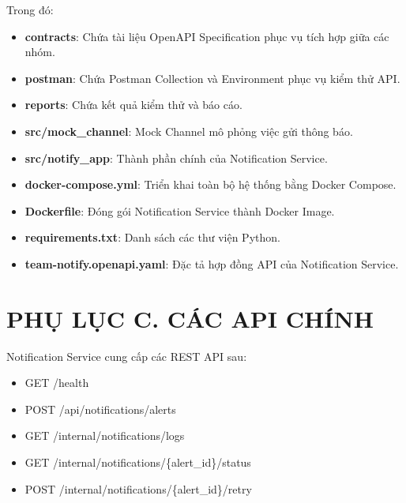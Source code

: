 Trong đó:

\begin{itemize}

\item \textbf{contracts}: Chứa tài liệu OpenAPI Specification phục vụ tích hợp giữa các nhóm.

\item \textbf{postman}: Chứa Postman Collection và Environment phục vụ kiểm thử API.

\item \textbf{reports}: Chứa kết quả kiểm thử và báo cáo.

\item \textbf{src/mock\_channel}: Mock Channel mô phỏng việc gửi thông báo.

\item \textbf{src/notify\_app}: Thành phần chính của Notification Service.

\item \textbf{docker-compose.yml}: Triển khai toàn bộ hệ thống bằng Docker Compose.

\item \textbf{Dockerfile}: Đóng gói Notification Service thành Docker Image.

\item \textbf{requirements.txt}: Danh sách các thư viện Python.

\item \textbf{team-notify.openapi.yaml}: Đặc tả hợp đồng API của Notification Service.

\end{itemize}

\section*{PHỤ LỤC C. CÁC API CHÍNH}

Notification Service cung cấp các REST API sau:

\begin{itemize}

\item GET /health

\item POST /api/notifications/alerts

\item GET /internal/notifications/logs

\item GET /internal/notifications/\{alert\_id\}/status

\item POST /internal/notifications/\{alert\_id\}/retry

\end{itemize}

